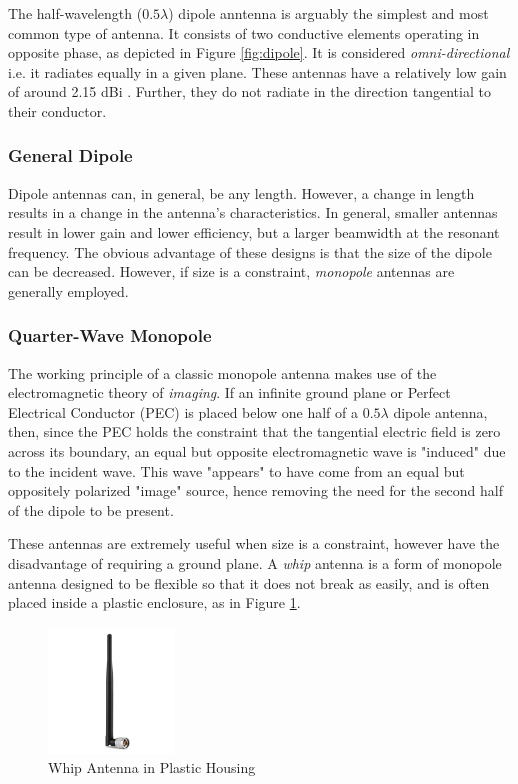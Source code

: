 The half-wavelength ($0.5 \lambda$) dipole anntenna is arguably the simplest and most common type of antenna. It consists of two conductive elements operating in opposite phase, as depicted in Figure \ref{fig:dipole}. It is considered \textit{omni-directional} i.e. it radiates equally in a given plane. These antennas have a relatively low gain of around 2.15 dBi \cite{site-antennaTheory}. Further, they do not radiate in the direction tangential to their conductor.

\subsubsection{General Dipole}
Dipole antennas can, in general, be any length. However, a change in length results in a change in the antenna's characteristics. In general, smaller antennas result in lower gain and lower efficiency, but a larger beamwidth at the resonant frequency. The obvious advantage of these designs is that the size of the dipole can be decreased. However, if size is a constraint, \textit{monopole} antennas are generally employed.

\subsubsection{Quarter-Wave Monopole}\label{monopole}
The working principle of a classic monopole antenna makes use of the electromagnetic theory of \textit{imaging}. If an infinite ground plane or Perfect Electrical Conductor (PEC) is placed below one half of a $0.5 \lambda$ dipole antenna, then, since the PEC holds the constraint that the tangential electric field is zero across its boundary, an equal but opposite electromagnetic wave is "induced" due to the incident wave. This wave "appears" to have come from an equal but oppositely polarized "image" source, hence removing the need for the second half of the dipole to be present.

These antennas are extremely useful when size is a constraint, however have the disadvantage of requiring a ground plane. A \textit{whip} antenna is a form of monopole antenna designed to be flexible so that it does not break as easily, and is often placed inside a plastic enclosure, as in Figure \ref{fig:whip}. \cite{site-antennaTheory}

\begin{figure}[!htb]
  \centering
  \includegraphics[width=0.3\textwidth]{whip}
  \caption{Whip Antenna in Plastic Housing}
  \label{fig:whip}
\end{figure}

